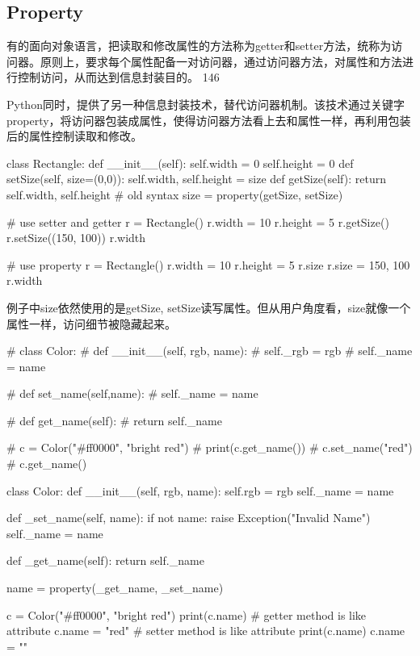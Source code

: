 \subsection{Property}
有的面向对象语言，把读取和修改属性的方法称为getter和setter方法，统称为访问器。原则上，要求每个属性配备一对访问器，通过访问器方法，对属性和方法进行控制访问，从而达到信息封装目的。
{1}{46}

Python同时，提供了另一种信息封装技术，替代访问器机制。该技术通过关键字property，将访问器包装成属性，使得访问器方法看上去和属性一样，再利用包装后的属性控制读取和修改。
\begin{python}
class Rectangle:
    def __init__(self):
        self.width = 0
        self.height = 0
    def setSize(self, size=(0,0)):
        self.width, self.height = size
    def getSize(self):
        return self.width, self.height
# old syntax
    size = property(getSize, setSize)

# use setter and getter
r = Rectangle()
r.width = 10
r.height = 5
r.getSize()
r.setSize((150, 100))
r.width

# use property
r = Rectangle()
r.width = 10
r.height = 5
r.size
r.size = 150, 100
r.width
\end{python}
例子中size依然使用的是getSize, setSize读写属性。但从用户角度看，size就像一个属性一样，访问细节被隐藏起来。

\begin{python}
# class Color:
#     def __init__(self, rgb, name):
#         self._rgb = rgb
#         self._name = name

#     def set_name(self,name):
#         self._name = name

#     def get_name(self):
#         return self._name

# c = Color("#ff0000", "bright red")
# print(c.get_name())
# c.set_name("red")
# c.get_name()

class Color:
    def __init__(self, rgb, name):
        self.rgb = rgb
        self._name = name

    def _set_name(self, name):
        if not name:
            raise Exception("Invalid Name")
        self._name = name

    def _get_name(self):
        return self._name

    name = property(_get_name, _set_name)

c = Color("#ff0000", "bright red")
print(c.name)    # getter method is like attribute
c.name = "red"   # setter method is like attribute
print(c.name)
c.name = ""
\end{python}

